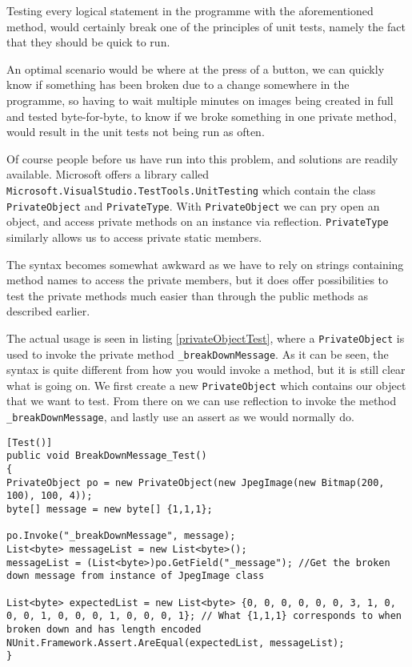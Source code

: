 Testing every logical statement in the programme with the aforementioned method, would certainly break one of the principles of unit tests, namely the fact that they should be quick to run.

An optimal scenario would be where at the press of a button, we can quickly know if something has been broken due to a change somewhere in the programme, so having to wait multiple minutes on images being created in full and tested byte-for-byte, to know if we broke something in one private method, would result in the unit tests not being run as often. 

Of course people before us have run into this problem, and solutions are readily available.
Microsoft offers a library called \lstinline|Microsoft.VisualStudio.TestTools.UnitTesting| which contain the class \lstinline|PrivateObject| and \lstinline|PrivateType|.
With \lstinline|PrivateObject| we can pry open an object, and access private methods on an instance via reflection. \lstinline|PrivateType| similarly allows us to access private static members. 

The syntax becomes somewhat awkward as we have to rely on strings containing method names to access the private members, but it does offer possibilities to test the private methods much easier than through the public methods as described earlier.

The actual usage is seen in listing \ref{privateObjectTest}, where a \lstinline|PrivateObject| is used to invoke the private method \lstinline|_breakDownMessage|. As it can be seen, the syntax is quite different from how you would invoke a method, but it is still clear what is going on. We first create a new \lstinline|PrivateObject| which contains our object that we want to test.  From there on we can use reflection to invoke the method \lstinline|_breakDownMessage|, and lastly use an assert as we would normally do.

\begin{lstlisting}[firstnumber=23,label=privateObjectTest,caption={Example usage of the \lstinline|PrivateObject| class \textbf{File: }JPEGImageTests.cs}]
[Test()]
public void BreakDownMessage_Test()
{
PrivateObject po = new PrivateObject(new JpegImage(new Bitmap(200, 100), 100, 4));
byte[] message = new byte[] {1,1,1};

po.Invoke("_breakDownMessage", message);
List<byte> messageList = new List<byte>();
messageList = (List<byte>)po.GetField("_message"); //Get the broken down message from instance of JpegImage class

List<byte> expectedList = new List<byte> {0, 0, 0, 0, 0, 0, 3, 1, 0, 0, 0, 1, 0, 0, 0, 1, 0, 0, 0, 1}; // What {1,1,1} corresponds to when broken down and has length encoded
NUnit.Framework.Assert.AreEqual(expectedList, messageList);
}
\end{lstlisting}

